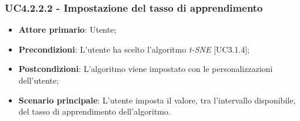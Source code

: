 \subsubsection{UC4.2.2.2 - Impostazione del tasso di apprendimento}
\begin{itemize}
	\item \textbf{Attore primario}: Utente;
	
	\item \textbf{Precondizioni}: L'utente ha scelto l'algoritmo \textit{t-SNE} [UC3.1.4];
	
	\item \textbf{Postcondizioni}: L'algoritmo viene impostato con le personalizzazioni dell'utente;
	
	\item \textbf{Scenario principale}: L'utente imposta il valore, tra l'intervallo disponibile, del tasso di apprendimento dell'algoritmo.

\end{itemize}
